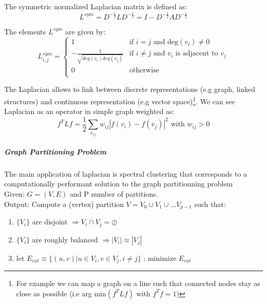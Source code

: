 \documentclass{report}
\begin{document}
The symmetric normalized Laplacian matrix is defined as:
\begin{equation}
L^{sym} = D^{-\tfrac{1}{2}} L D^{-\tfrac{1}{2}} = I -D^{-\tfrac{1}{2}} A D^{-\tfrac{1}{2}} 
\end{equation}

The elements $L^{sym}$ are given by:
\begin{equation}
L^{sym}_{i,j}= 
\begin{cases}
1 & \text{if $i=j$ and deg$(v_i) \neq 0$}\\
-\tfrac{1}{\sqrt{deg(v_i)deg(v_j)}} &\text{if $i \neq j$ and $v_i$ is adjacent to $v_j$}\\
0 &\text{otherwise}\\
\end{cases}
\end{equation}

The Laplacian allows to link between discrete representations (e.g graph, linked structures) and continuous representation (e.g vector space)\footnote{For example we can map a graph on a line such that connected nodes stay as close as possible (i.e arg min$(f^T L f )$ with $f^Tf=1$)}.
We can see Laplacian as an operator in simple graph weighted as:
\begin{equation}
f^T L f = \dfrac{1}{2}\sum_{e_{ij}} w_{ij}|f(v_i)-f(v_j)|^2    \text{            	with $w_{ij}>0$} 
\end{equation} 


\subparagraph{Graph Partitioning Problem}
The main application of laplacian is spectral clustering that corresponds to a computationally performant solution to the graph partitionning problem \\
Given: 
$G = (V, E) $ and  P number of partitions.\\ Output:
	Compute a (vertex) partition $V=V_0 \cup V_1 \cup ... V_{p-1}$ such that:
	\begin{enumerate}
	\item $ \{V_i \} $ are disjoint $\Rightarrow V_i \cap V_j = \oslash$
	\item $ \{V_i \} $ are roughly balanced $\Rightarrow |V_i| \approx |V_j| $
	\item let $E_{cut} \equiv \{ (u,v) | u \in V_i, v \in V_j, i \neq j\} $ :  minimize $E_{cut}$
	\end{enumerate}
\end{document}
